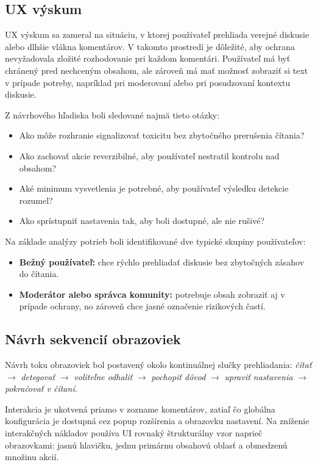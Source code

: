 \subsection{UX výskum}
UX výskum sa zameral na situáciu, v ktorej používateľ prehliada verejné diskusie alebo dlhšie vlákna komentárov. V takomto prostredí je dôležité, aby ochrana nevyžadovala zložité rozhodovanie pri každom komentári. Používateľ má byť chránený pred nechceným obsahom, ale zároveň má mať možnosť zobraziť si text v prípade potreby, napríklad pri moderovaní alebo pri posudzovaní kontextu diskusie.

Z návrhového hľadiska boli sledované najmä tieto otázky:
\begin{itemize}
  \item Ako môže rozhranie signalizovať toxicitu bez zbytočného prerušenia čítania?
  \item Ako zachovať akcie reverzibilné, aby používateľ nestratil kontrolu nad obsahom?
  \item Aké minimum vysvetlenia je potrebné, aby používateľ výsledku detekcie rozumel?
  \item Ako sprístupniť nastavenia tak, aby boli dostupné, ale nie rušivé?
\end{itemize}

Na základe analýzy potrieb boli identifikované dve typické skupiny používateľov:
\begin{itemize}
  \item \textbf{Bežný používateľ:} chce rýchlo prehliadať diskusie bez zbytočných zásahov do čítania.
  \item \textbf{Moderátor alebo správca komunity:} potrebuje obsah zobraziť aj v prípade ochrany, no zároveň chce jasné označenie rizikových častí.
\end{itemize}

\subsection{Návrh sekvencií obrazoviek}
Návrh toku obrazoviek bol postavený okolo kontinuálnej slučky prehliadania:
\textit{čítať} $\rightarrow$ \textit{detegovať} $\rightarrow$ \textit{voliteľne odhaliť} $\rightarrow$ \textit{pochopiť dôvod} $\rightarrow$ \textit{upraviť nastavenia} $\rightarrow$ \textit{pokračovať v čítaní}.

Interakcia je ukotvená priamo v zozname komentárov, zatiaľ čo globálna konfigurácia je dostupná cez popup rozšírenia a obrazovku nastavení. Na zníženie interakčných nákladov používa UI rovnaký štrukturálny vzor naprieč obrazovkami: jasnú hlavičku, jednu primárnu obsahovú oblasť a obmedzenú množinu akcií.

